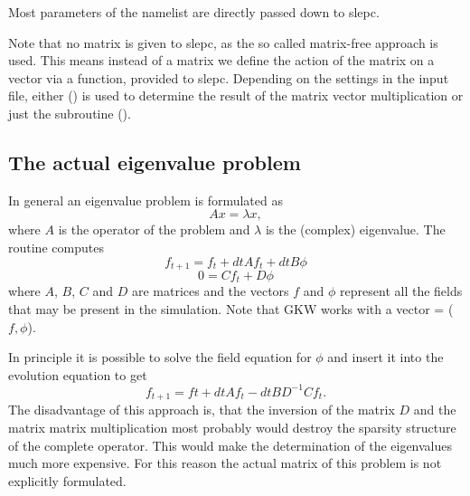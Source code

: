 Most parameters of the  namelist are directly passed down to
 {\sc slepc}.

Note that no matrix is given to {\sc slepc}, as the so called matrix-free approach
is used. This means instead of a matrix we define the action of the matrix
on a vector via a function, provided to {\sc slepc}.
Depending on the settings in the input file, either  
() is used
to determine the result of the matrix vector multiplication or just the subroutine
 ().


\subsection{The actual eigenvalue problem}
\label{subsec:eivproblem}
In general an eigenvalue problem is formulated as
\begin{equation}
  A x = \lambda x, \label{eq:eivgen}
\end{equation}
where $A$ is the operator of the problem and $\lambda$ is the (complex)
eigenvalue.
The  routine computes
\begin{equation}
  f_{t+1} = f_{t} + dt A f_{t} + dt B \phi
\end{equation}
\begin{equation}
  0 = C f_{t} + D \phi
\end{equation}
where $A$, $B$, $C$ and $D$ are matrices and the vectors $f$ and $\phi$
represent all the fields that may be present in the simulation.
Note that GKW works with a vector  = ($f, \phi$).

In principle it is possible to solve the field equation for $\phi$ and insert
it into the evolution equation to get
\begin{equation}
  f_{t+1} = f{t} + dt A f_{t} - dt B D^{-1} C f_{t}.
\end{equation}
The disadvantage of this approach is, that the inversion of the matrix $D$
and the matrix matrix multiplication most probably would destroy the sparsity
structure of the complete operator. 
This would make the determination of the eigenvalues much more expensive.
For this reason the actual matrix of this problem is not explicitly formulated.


